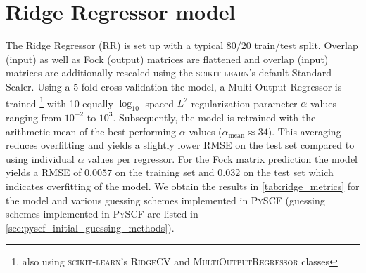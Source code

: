\section{Ridge Regressor model} %
\label{sec:ridge_regressor_model}
The Ridge Regressor (RR) is set up with a typical $80 / 20$ train/test split. Overlap (input) as well as Fock (output) matrices are flattened and overlap (input) matrices are additionally rescaled using the \textsc{scikit-learn}'s default Standard Scaler. \parencite{ref:sk-learn} Using a 5-fold cross validation the model, a Multi-Output-Regressor is trained \footnote{also using \textsc{scikit-learn}'s \textsc{RidgeCV} and \textsc{MultiOutputRegressor} classes} with 10 equally $\log_{10}$-spaced $L^2$-regularization parameter $\alpha$ values ranging from $10^{-2}$ to $10^{3}$. Subsequently, the model is retrained with the arithmetic mean of the best performing $\alpha$ values ($\alpha_{\text{mean}} \approx 34$). This averaging reduces overfitting and yields a slightly lower RMSE on the test set compared to using individual $\alpha$ values per regressor. %
For the Fock matrix prediction the model yields a RMSE of $0.0057$ on the training set and $0.032$ on the test set which indicates overfitting of the model. We obtain the results in \autoref{tab:ridge_metrics} for the model and various guessing schemes implemented in \textsc{PySCF} (guessing schemes implemented in \textsc{PySCF} are listed in \autoref{sec:pyscf_initial_guessing_methods}).

